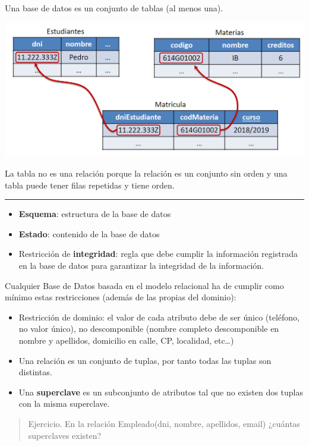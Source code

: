 \documentclass[
]{book}
\begin{document}
Una base de datos es un conjunto de tablas (al menos una).

\includegraphics[width=6.25in,height=\textheight]{images/BBDD.png}

La tabla no es una relación porque la relación es un conjunto sin orden y una tabla puede tener filas repetidas y tiene orden.

\begin{center}\rule{0.5\linewidth}{0.5pt}\end{center}

\begin{itemize}
\item
  \textbf{Esquema}: estructura de la base de datos
\item
  \textbf{Estado}: contenido de la base de datos
\item
  Restricción de \textbf{integridad}: regla que debe cumplir la información registrada en la base de datos para garantizar la integridad de la información.
\end{itemize}

Cualquier Base de Datos basada en el modelo relacional ha de cumplir como mínimo estas restricciones (además de las propias del dominio):

\begin{itemize}
\item
  Restricción de dominio: el valor de cada atributo debe de ser único (teléfono, no valor único), no descomponible (nombre completo descomponible en nombre y apellidos, domicilio en calle, CP, localidad, etc\ldots)
\item
  Una relación es un conjunto de tuplas, por tanto todas las tuplas son distintas.
\item
  Una \textbf{superclave} es un subconjunto de atributos tal que no existen dos tuplas con la misma superclave.
\end{itemize}

\begin{quote}
Ejercicio. En la relación Empleado(dni, nombre, apellidos, email) ¿cuántas superclaves existen?
\end{quote}
\end{document}
